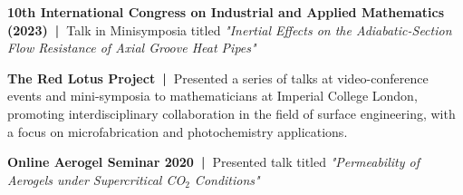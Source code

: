 \documentclass[letterpaper,11pt]{article}
\begin{document}
\newcommand{\TalkBullet}[2]
{\item\small{\textbf{#1}{#2 \vspace{-7.5pt}}}}

\TalkList
\TalkBullet{10th International Congress on
Industrial and Applied Mathematics (2023)~|~}{Talk in Minisymposia titled \textit{"Inertial Effects on the Adiabatic-Section Flow Resistance of Axial Groove Heat Pipes"}}
\TalkBullet{The Red Lotus Project~|~}{Presented a series of talks at video-conference events and mini-symposia to mathematicians at Imperial College London, promoting interdisciplinary collaboration in the field of surface engineering, with a focus on microfabrication and photochemistry applications.}
\TalkBullet{Online Aerogel Seminar 2020~|~}{Presented talk titled \textit{"Permeability of Aerogels under Supercritical CO$_2$ Conditions"}}

\TalkListEnd





\end{document}

